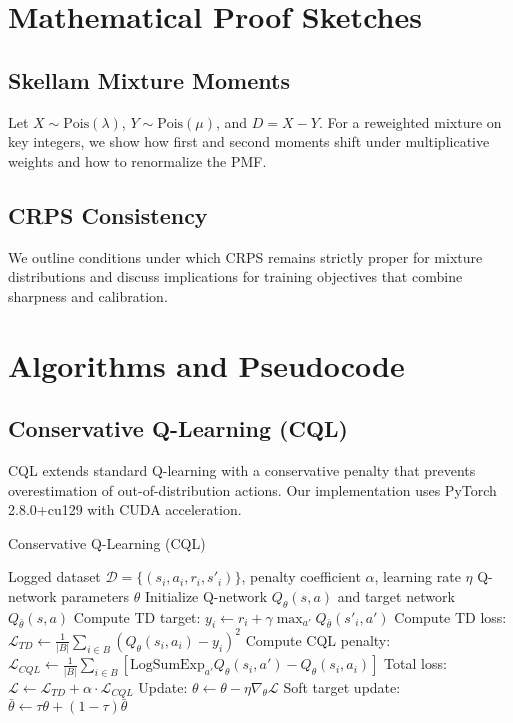 \section{Mathematical Proof Sketches}\label{app:proofs}

\subsection{Skellam Mixture Moments}
Let $X\sim\text{Pois}(\lambda)$, $Y\sim\text{Pois}(\mu)$, and $D=X-Y$. For a reweighted mixture on key integers, we show how first and second moments shift under multiplicative weights and how to renormalize the PMF.

\subsection{CRPS Consistency}
We outline conditions under which CRPS remains strictly proper for mixture distributions and discuss implications for training objectives that combine sharpness and calibration.

\section{Algorithms and Pseudocode}\label{app:algorithms}

\subsection{Conservative Q-Learning (CQL)}
CQL extends standard Q-learning with a conservative penalty that prevents overestimation of out-of-distribution actions. Our implementation uses PyTorch 2.8.0+cu129 with CUDA acceleration.

\begin{algorithm}[H]
\caption{Conservative Q-Learning (CQL)}
\begin{algorithmic}[1]
\Require Logged dataset $\mathcal{D} = \{(s_i, a_i, r_i, s'_i)\}$, penalty coefficient $\alpha$, learning rate $\eta$
\Ensure Q-network parameters $\theta$
\State Initialize Q-network $Q_\theta(s,a)$ and target network $Q_{\bar\theta}(s,a)$
    \State Compute TD target: $y_i \gets r_i + \gamma \max_{a'} Q_{\bar\theta}(s'_i, a')$
    \State Compute TD loss: $\mathcal{L}_{TD} \gets \frac{1}{|B|} \sum_{i \in B} (Q_\theta(s_i, a_i) - y_i)^2$
    \State Compute CQL penalty: $\mathcal{L}_{CQL} \gets \frac{1}{|B|} \sum_{i \in B} \left[\text{LogSumExp}_{a'} Q_\theta(s_i, a') - Q_\theta(s_i, a_i)\right]$
    \State Total loss: $\mathcal{L} \gets \mathcal{L}_{TD} + \alpha \cdot \mathcal{L}_{CQL}$
    \State Update: $\theta \gets \theta - \eta \nabla_\theta \mathcal{L}$
  \EndFor
  \State Soft target update: $\bar\theta \gets \tau \theta + (1 - \tau) \bar\theta$
\EndFor
\end{algorithmic}
\end{algorithm}


